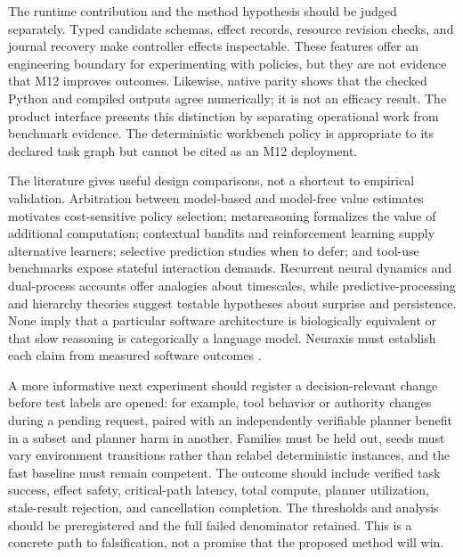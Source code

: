 \documentclass[11pt]{article}
\begin{document}
The runtime contribution and the method hypothesis should be judged separately. Typed candidate schemas, effect records, resource revision checks, and journal recovery make controller effects inspectable. These features offer an engineering boundary for experimenting with policies, but they are not evidence that M12 improves outcomes. Likewise, native parity shows that the checked Python and compiled outputs agree numerically; it is not an efficacy result. The product interface presents this distinction by separating operational work from benchmark evidence. The deterministic workbench policy is appropriate to its declared task graph but cannot be cited as an M12 deployment.

The literature gives useful design comparisons, not a shortcut to empirical validation. Arbitration between model-based and model-free value estimates motivates cost-sensitive policy selection; metareasoning formalizes the value of additional computation; contextual bandits and reinforcement learning supply alternative learners; selective prediction studies when to defer; and tool-use benchmarks expose stateful interaction demands. Recurrent neural dynamics and dual-process accounts offer analogies about timescales, while predictive-processing and hierarchy theories suggest testable hypotheses about surprise and persistence. None imply that a particular software architecture is biologically equivalent or that slow reasoning is categorically a language model. Neuraxis must establish each claim from measured software outcomes \cite{daw2005,lee2014,kool2016,russell1991,sutton1999,madras2018,mozannar2020,dptagent,toolsandbox,react,toolformer,swebench,taubench,rao1999,mante2013,botvinick,cho2014,li2010,schulman2017,suttonbarto2018,efron1993,demsar2006,nadeau2003,guo2017,friedman2001,chen2016,bai,jev,bs1,asyncbench,interruptbench,lamport1998,hadfieldmenell2016,amodei2016,leike2018}.

A more informative next experiment should register a decision-relevant change before test labels are opened: for example, tool behavior or authority changes during a pending request, paired with an independently verifiable planner benefit in a subset and planner harm in another. Families must be held out, seeds must vary environment transitions rather than relabel deterministic instances, and the fast baseline must remain competent. The outcome should include verified task success, effect safety, critical-path latency, total compute, planner utilization, stale-result rejection, and cancellation completion. The thresholds and analysis should be preregistered and the full failed denominator retained. This is a concrete path to falsification, not a promise that the proposed method will win.
\end{document}
